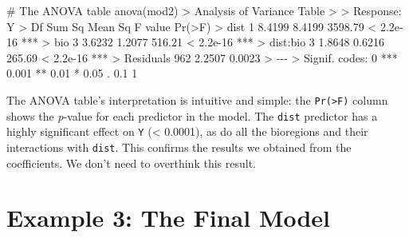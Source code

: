\documentclass[
  letterpaper,
]{book}
\newenvironment{Shaded}{\begin{snugshade}}{\end{snugshade}}
\newcommand{\CommentTok}[1]{\textcolor[rgb]{0.37,0.37,0.37}{#1}}
\newcommand{\DecValTok}[1]{\textcolor[rgb]{0.68,0.00,0.00}{#1}}
\newcommand{\ErrorTok}[1]{\textcolor[rgb]{0.68,0.00,0.00}{#1}}
\newcommand{\FloatTok}[1]{\textcolor[rgb]{0.68,0.00,0.00}{#1}}
\newcommand{\FunctionTok}[1]{\textcolor[rgb]{0.28,0.35,0.67}{#1}}
\newcommand{\NormalTok}[1]{\textcolor[rgb]{0.00,0.23,0.31}{#1}}
\newcommand{\SpecialCharTok}[1]{\textcolor[rgb]{0.37,0.37,0.37}{#1}}
\newcommand{\StringTok}[1]{\textcolor[rgb]{0.13,0.47,0.30}{#1}}
\begin{document}
\begin{Shaded}
\begin{Highlighting}[]
\CommentTok{\# The ANOVA table}
\FunctionTok{anova}\NormalTok{(mod2)}
\SpecialCharTok{\textgreater{}}\NormalTok{ Analysis of Variance Table}
\SpecialCharTok{\textgreater{}} 
\ErrorTok{\textgreater{}}\NormalTok{ Response}\SpecialCharTok{:}\NormalTok{ Y}
\SpecialCharTok{\textgreater{}}\NormalTok{            Df Sum Sq Mean Sq F value    }\FunctionTok{Pr}\NormalTok{(}\SpecialCharTok{\textgreater{}}\NormalTok{F)    }
\SpecialCharTok{\textgreater{}}\NormalTok{ dist        }\DecValTok{1} \FloatTok{8.4199}  \FloatTok{8.4199} \FloatTok{3598.79} \SpecialCharTok{\textless{}} \FloatTok{2.2e{-}16} \SpecialCharTok{**}\ErrorTok{*}
\ErrorTok{\textgreater{}}\NormalTok{ bio         }\DecValTok{3} \FloatTok{3.6232}  \FloatTok{1.2077}  \FloatTok{516.21} \SpecialCharTok{\textless{}} \FloatTok{2.2e{-}16} \SpecialCharTok{**}\ErrorTok{*}
\ErrorTok{\textgreater{}}\NormalTok{ dist}\SpecialCharTok{:}\NormalTok{bio    }\DecValTok{3} \FloatTok{1.8648}  \FloatTok{0.6216}  \FloatTok{265.69} \SpecialCharTok{\textless{}} \FloatTok{2.2e{-}16} \SpecialCharTok{**}\ErrorTok{*}
\ErrorTok{\textgreater{}}\NormalTok{ Residuals }\DecValTok{962} \FloatTok{2.2507}  \FloatTok{0.0023}                      
\SpecialCharTok{\textgreater{}} \SpecialCharTok{{-}{-}{-}}
\ErrorTok{\textgreater{}}\NormalTok{ Signif. codes}\SpecialCharTok{:}  \DecValTok{0} \StringTok{\textquotesingle{}***\textquotesingle{}} \FloatTok{0.001} \StringTok{\textquotesingle{}**\textquotesingle{}} \FloatTok{0.01} \StringTok{\textquotesingle{}*\textquotesingle{}} \FloatTok{0.05} \StringTok{\textquotesingle{}.\textquotesingle{}} \FloatTok{0.1} \StringTok{\textquotesingle{} \textquotesingle{}} \DecValTok{1}
\end{Highlighting}
\end{Shaded}

The ANOVA table's interpretation is intuitive and simple: the
\texttt{Pr(\textgreater{}F)} column shows the \emph{p}-value for each
predictor in the model. The \texttt{dist} predictor has a highly
significant effect on \texttt{Y} (\textless{} 0.0001), as do all the
bioregions and their interactions with \texttt{dist}. This confirms the
results we obtained from the coefficients. We don't need to overthink
this result.

\section{Example 3: The Final Model}\label{example-3-the-final-model}
\end{document}
